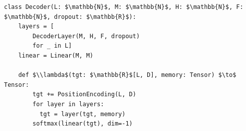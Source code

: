\documentclass[border=10pt]{standalone}
\begin{document}
\begin{lstlisting}
class Decoder(L: $\mathbb{N}$, M: $\mathbb{N}$, H: $\mathbb{N}$, F: $\mathbb{N}$, dropout: $\mathbb{R}$):
    layers = [
        DecoderLayer(M, H, F, dropout)
        for _ in L]
    linear = Linear(M, M)

    def $\\lambda$(tgt: $\mathbb{R}$[L, D], memory: Tensor) $\to$ Tensor:
        tgt += PositionEncoding(L, D)
        for layer in layers:
          tgt = layer(tgt, memory)
        softmax(linear(tgt), dim=-1)
\end{lstlisting}
\end{document}
